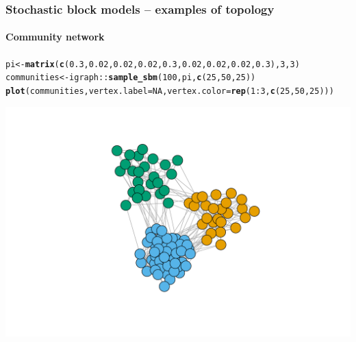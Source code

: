 \documentclass{beamer}\usepackage[]{graphicx}\usepackage[]{color}
\makeatletter
\newcommand{\hlnum}[1]{\textcolor[rgb]{0.686,0.059,0.569}{#1}}%
\newcommand{\hlopt}[1]{\textcolor[rgb]{0,0,0}{#1}}%
\newcommand{\hlstd}[1]{\textcolor[rgb]{0.345,0.345,0.345}{#1}}%
\newcommand{\hlkwb}[1]{\textcolor[rgb]{0.69,0.353,0.396}{#1}}%
\newcommand{\hlkwc}[1]{\textcolor[rgb]{0.333,0.667,0.333}{#1}}%
\newcommand{\hlkwd}[1]{\textcolor[rgb]{0.737,0.353,0.396}{\textbf{#1}}}%
\newenvironment{kframe}{%
 \def\at@end@of@kframe{}%
 \ifinner\ifhmode%
  \def\at@end@of@kframe{\end{minipage}}%
  \begin{minipage}{\columnwidth}%
 \fi\fi%
 \def\FrameCommand##1{\hskip\@totalleftmargin \hskip-\fboxsep
 \colorbox{shadecolor}{##1}\hskip-\fboxsep
     \hskip-\linewidth \hskip-\@totalleftmargin \hskip\columnwidth}%
 \MakeFramed {\advance\hsize-\width
   \@totalleftmargin\z@ \linewidth\hsize
   \@setminipage}}%
 {\par\unskip\endMakeFramed%
 \at@end@of@kframe}
\newenvironment{knitrout}{}{} %
\makeatother
\begin{document}
\begin{frame}[fragile]
  \frametitle{Stochastic block models -- examples of topology}
  \framesubtitle{Community network}

\begin{knitrout}\scriptsize
{}\color{fgcolor}\begin{kframe}
\begin{alltt}
\hlstd{pi} \hlkwb{<-} \hlkwd{matrix}\hlstd{(}\hlkwd{c}\hlstd{(}\hlnum{0.3}\hlstd{,}\hlnum{0.02}\hlstd{,}\hlnum{0.02}\hlstd{,}\hlnum{0.02}\hlstd{,}\hlnum{0.3}\hlstd{,}\hlnum{0.02}\hlstd{,}\hlnum{0.02}\hlstd{,}\hlnum{0.02}\hlstd{,}\hlnum{0.3}\hlstd{),}\hlnum{3}\hlstd{,}\hlnum{3}\hlstd{)}
\hlstd{communities} \hlkwb{<-} \hlstd{igraph}\hlopt{::}\hlkwd{sample_sbm}\hlstd{(}\hlnum{100}\hlstd{, pi,} \hlkwd{c}\hlstd{(}\hlnum{25}\hlstd{,} \hlnum{50}\hlstd{,} \hlnum{25}\hlstd{))}
\hlkwd{plot}\hlstd{(communities,} \hlkwc{vertex.label}\hlstd{=}\hlnum{NA}\hlstd{,} \hlkwc{vertex.color} \hlstd{=} \hlkwd{rep}\hlstd{(}\hlnum{1}\hlopt{:}\hlnum{3}\hlstd{,}\hlkwd{c}\hlstd{(}\hlnum{25}\hlstd{,} \hlnum{50}\hlstd{,} \hlnum{25}\hlstd{)))}
\end{alltt}
\end{kframe}
\includegraphics[width=.8\textwidth]{figures/unnamed-chunk-7-1} 

\end{knitrout}

\end{frame}
\end{document}
